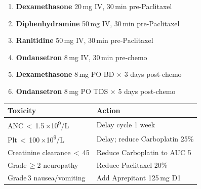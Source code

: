\documentclass[11pt,a4paper]{scrartcl}
\newcommand{\drugname}[1]{\textbf{\textcolor{NavyDeep}{#1}}}
\begin{document}
\noindent
\begin{minipage}[t]{0.475\linewidth}
  \begin{tcolorbox}[infobox, title={\faSyringe\quad Pre-medication Protocol}, breakable=false]
    \footnotesize
    \begin{enumerate}[leftmargin=1.2em, label=\textbf{\arabic*.}, itemsep=2pt]
      \item \drugname{Dexamethasone} 20\,mg IV, 30\,min pre-Paclitaxel
      \item \drugname{Diphenhydramine} 50\,mg IV, 30\,min pre-Paclitaxel
      \item \drugname{Ranitidine} 50\,mg IV, 30\,min pre-Paclitaxel
      \item \drugname{Ondansetron} 8\,mg IV, 30\,min pre-chemo
      \item \drugname{Dexamethasone} 8\,mg PO BD $\times$ 3 days post-chemo
      \item \drugname{Ondansetron} 8\,mg PO TDS $\times$ 5 days post-chemo
    \end{enumerate}
  \end{tcolorbox}
\end{minipage}%
\hfill
\begin{minipage}[t]{0.495\linewidth}
  \begin{tcolorbox}[warnbox, title={\faExclamationTriangle\quad Dose Modification Triggers}, breakable=false]
    \footnotesize
    \begin{tabular}{@{} l p{4.6cm} @{}}
      \toprule
      \textbf{Toxicity} & \textbf{Action} \\
      \midrule
      ANC\,$<$\,1.5\,\(\times\)10\textsuperscript{9}/L & Delay cycle 1 week \\
      Plt\,$<$\,100\,\(\times\)10\textsuperscript{9}/L & Delay; reduce Carboplatin 25\% \\
      Creatinine clearance\,$<$\,45 & Reduce Carboplatin to AUC 5 \\
      Grade\,\(\geq\)2 neuropathy & Reduce Paclitaxel 20\% \\
      Grade\,3 nausea/vomiting & Add Aprepitant 125\,mg D1 \\
    \end{tabular}
  \end{tcolorbox}
\end{minipage}

\par
\vspace{5mm}
\end{document}

